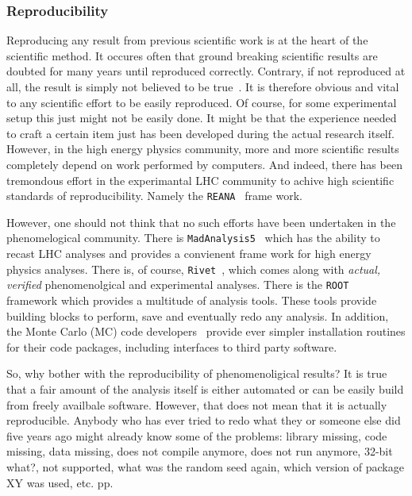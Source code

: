 \documentclass[aps,prd,11pt,tightenlines,superscriptaddress,nofootinbib,preprintnumbers,notitlepage]{revtex4-1}
\begin{document}
\subsubsection{Reproducibility}

Reproducing any result from previous scientific work is at the heart
of the scientific method. It occures often that ground breaking
scientific results are doubted for many years until reproduced
correctly. Contrary, if not reproduced at all, the result is simply
not believed to be true~\cite{}. It is therefore obvious and vital to
any scientific effort to be easily reproduced. Of course, for some
experimental setup this just might not be easily done. It might be
that the experience needed to craft a certain item just has been
developed during the actual research itself. However, in the high
energy physics community, more and more scientific results completely
depend on work performed by computers. And indeed, there has been
tremondous effort in the experimantal LHC community to achive high
scientific standards of reproducibility. Namely the
\texttt{REANA}~\cite{} frame work.

However, one should not think that no such efforts have been
undertaken in the phenomelogical community. There is
\texttt{MadAnalysis5}~\cite{} which has the ability to recast LHC
analyses and provides a convienent frame work for high energy physics
analyses. There is, of course, \texttt{Rivet}~\cite{}, which comes
along with \emph{actual, verified} phenomenolgical and experimental
analyses. There is the \texttt{ROOT}~\cite{} framework which provides
a multitude of analysis tools. These tools provide building blocks to
perform, save and eventually redo any analysis. In addition, the Monte
Carlo (MC) code developers~\cite{} provide ever simpler installation
routines for their code packages, including interfaces to third party
software.

So, why bother with the reproducibility of phenomenoligical results?
It is true that a fair amount of the analysis itself is either
automated or can be easily build from freely availbale
software. However, that does not mean that it is actually
reproducible. Anybody who has ever tried to redo what they or someone
else did five years ago might already know some of the problems:
library missing, code missing, data missing, does not compile anymore,
does not run anymore, 32-bit what?, not supported, what was the random
seed again, which version of package XY was used, etc. pp.
\end{document}
